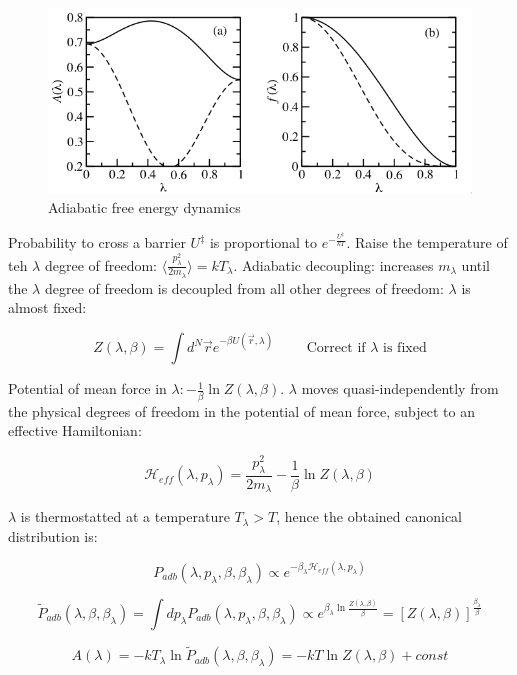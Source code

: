 	\begin{figure}[H]
		\includegraphics[width=\textwidth]{adiabatic-free-energy-dynamics}
		\caption{Adiabatic free energy dynamics}
		\label{fig:adiabatic-free-energy-dynamics}
	\end{figure}

	Probability to cross a barrier $U^{\ddagger}$ is proportional to $e^{-\frac{U^{\ddagger}}{kT}}$.
	Raise the temperature of teh $\lambda$ degree of freedom: $\biggl\langle\frac{p_\lambda^2}{2m_\lambda}\biggr\rangle = kT_\lambda$.
	Adiabatic decoupling: increases $m_\lambda$ until the $\lambda$ degree of freedom is decoupled from all other degrees of freedom: $\lambda$ is almost fixed:

	$$Z(\lambda, \beta) = \int d^N\vec{r}e^{-\beta U(\vec{r}, \lambda)}\qquad\text{ Correct if }\lambda\text{ is fixed}$$

	Potential of mean force in $\lambda:-\frac{1}{\beta}\ln Z(\lambda, \beta)$.
	$\lambda$ moves quasi-independently from the physical degrees of freedom in the potential of mean force, subject to an effective Hamiltonian:

	$$\mathcal{H}_{eff}(\lambda, p_\lambda) = \frac{p_\lambda^2}{2m_\lambda} -\frac{1}{\beta}\ln Z(\lambda, \beta)$$

	$\lambda$ is thermostatted at a temperature $T_\lambda>T$, hence the obtained canonical distribution is:

	$$P_{adb}(\lambda, p_\lambda, \beta, \beta_\lambda)\propto e^{-\beta_\lambda\mathcal{H}_{eff}(\lambda, p_\lambda)}$$

	$$\tilde{P}_{adb}(\lambda, \beta, \beta_\lambda) = \int dp_\lambda P_{adb}(\lambda, p_\lambda, \beta, \beta_\lambda)\propto e^{\beta_\lambda\ln \frac{Z(\lambda, \beta)}{\beta}} = [Z(\lambda, \beta)]^{\frac{\beta_\lambda}{\beta}}$$

	$$A(\lambda) = -kT_\lambda\ln\tilde{P}_{adb}(\lambda, \beta, \beta_\lambda) = -kT\ln Z(\lambda, \beta) + const$$


